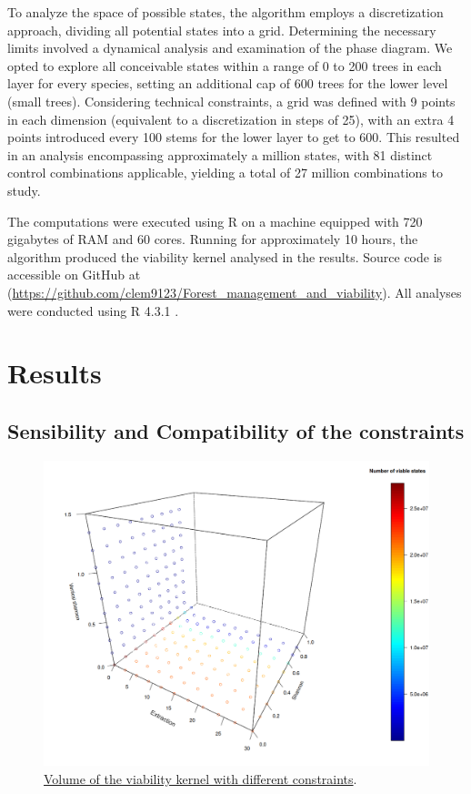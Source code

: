 \documentclass{article}
\begin{document}
To analyze the space of possible states, the algorithm employs a discretization approach, dividing all potential states into a grid. Determining the necessary limits involved a dynamical analysis and examination of the phase diagram. We opted to explore all conceivable states within a range of 0 to 200 trees in each layer for every species, setting an additional cap of 600 trees for the lower level (small trees). Considering technical constraints, a grid was defined with 9 points in each dimension (equivalent to a discretization in steps of 25), with an extra 4 points introduced every 100 stems for the lower layer to get to 600. This resulted in an analysis encompassing approximately a million states, with 81 distinct control combinations applicable, yielding a total of 27 million combinations to study.


The computations were executed using R on a machine equipped with 720 gigabytes of RAM and 60 cores. Running for approximately 10 hours, the algorithm produced the viability kernel analysed in the results. Source code is accessible on GitHub at (\url{https://github.com/clem9123/Forest_management_and_viability}). All analyses were conducted using R 4.3.1 \autocite{Rsoftware}.

\section{Results}

\subsection{Sensibility and Compatibility of the constraints}

\begin{figure}[t]
    \centering
    \includegraphics[width=\textwidth]{Figure/Results/Sensi.png}
    \caption{\underline{Volume of the viability kernel with different constraints}.}
    \label{fig:sensi}
\end{figure}
\end{document}
